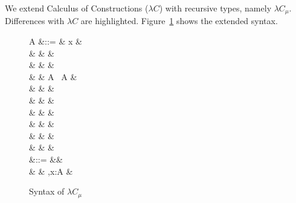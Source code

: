 We extend Calculus of Constructions ($\lambda C$) with recursive types, namely $\lambda C_{\mu}$. Differences with $\lambda C$ are highlighted. Figure~\ref{fig:musyn} shows the extended syntax.

\begin{figure}[H]
\small
\begin{syntax}
  A &::= & x &  \\
    & \mid & \star &  \\
    & \mid & \square &  \\
    & \mid & A \ A &  \\
    & \mid &  &  \\
    & \mid &  &  \\
    & \mid &  &  \\
    & \mid &  &  \\
    & \mid &  &  \\
    & \mid &  &  \\
  \Gamma &::= &\varnothing &  \\
         & \mid & \Gamma,x:A & 
\end{syntax}
\caption{Syntax of $\lambda C_\mu$}\label{fig:musyn}
\end{figure}
